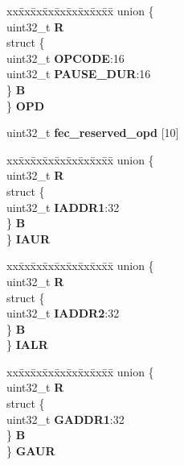 \begin{DoxyCompactItemize}
\begin{tabbing}
\end{tabbing}\item 
\mbox{\label{structFEC__tag_a35ade2342a04e90431e1f5fad2487ea1}} 
\begin{tabbing}
xx\=xx\=xx\=xx\=xx\=xx\=xx\=xx\=xx\=\kill
union \{\\
\>uint32\_t {\bfseries R}\\
\>struct \{\\
\>\>uint32\_t {\bfseries OPCODE}:16\\
\>\>uint32\_t {\bfseries PAUSE\_DUR}:16\\
\>\} {\bfseries B}\\
\} {\bfseries OPD}\\

\end{tabbing}\item 
\mbox{\label{structFEC__tag_a4676e920bd792368081c06a346b9e05b}} 
uint32\+\_\+t {\bfseries fec\+\_\+reserved\+\_\+opd} \mbox{[}10\mbox{]}
\item 
\mbox{\label{structFEC__tag_a6c7784ad4f7f55e035943406737ca506}} 
\begin{tabbing}
xx\=xx\=xx\=xx\=xx\=xx\=xx\=xx\=xx\=\kill
union \{\\
\>uint32\_t {\bfseries R}\\
\>struct \{\\
\>\>uint32\_t {\bfseries IADDR1}:32\\
\>\} {\bfseries B}\\
\} {\bfseries IAUR}\\

\end{tabbing}\item 
\mbox{\label{structFEC__tag_a368d1f3b24054f7432ad53975e030bb9}} 
\begin{tabbing}
xx\=xx\=xx\=xx\=xx\=xx\=xx\=xx\=xx\=\kill
union \{\\
\>uint32\_t {\bfseries R}\\
\>struct \{\\
\>\>uint32\_t {\bfseries IADDR2}:32\\
\>\} {\bfseries B}\\
\} {\bfseries IALR}\\

\end{tabbing}\item 
\mbox{\label{structFEC__tag_a9c40714e3d89d4770b93083699d39465}} 
\begin{tabbing}
xx\=xx\=xx\=xx\=xx\=xx\=xx\=xx\=xx\=\kill
union \{\\
\>uint32\_t {\bfseries R}\\
\>struct \{\\
\>\>uint32\_t {\bfseries GADDR1}:32\\
\>\} {\bfseries B}\\
\} {\bfseries GAUR}\\


\end{tabbing}
\end{DoxyCompactItemize}
